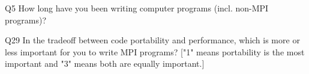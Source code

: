 \begin{description}%
\item{Q5} How long have you been writing computer programs (incl. non-MPI programs)?%
\item{Q29} In the tradeoff between code portability and performance, which is more or less important for you to write MPI programs? ["1" means portability is the most important and "3" means both are equally important.]%
\end{description}%
